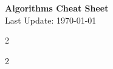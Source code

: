 \documentclass[10pt, a4paper, landscape]{article}
\begin{document}
\begin{center}
    {\Large \textbf{Algorithms Cheat Sheet}} \\
    \vspace{0.1cm}
    \small Last Update: \today
\end{center}

\vspace{-0.3cm}

\begin{multicols*}{2}
\tableofcontents
\end{multicols*}

\newpage

\begin{multicols*}{2}








\end{multicols*}
\end{document}
